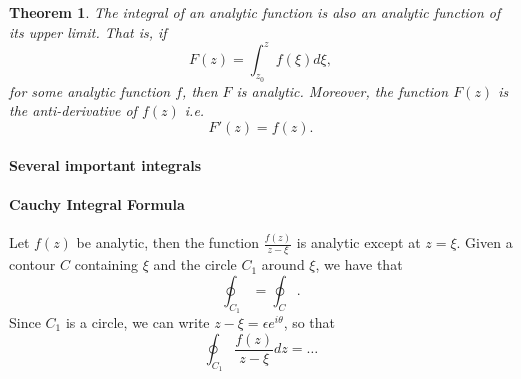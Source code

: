 \documentclass[12pt]{article}
\newcommand{\bbN}{\mathbb{N}}
\newtheorem{thm}{Theorem}[section]
\theoremstyle{definition}
\theoremstyle{remark}
\numberwithin{equation}{section}
\begin{document}


\begin{thm}
The integral of an analytic function is also an analytic function of its upper limit. That is, if 
\begin{equation}
  F(z) = \int_{z_0}^z f(\xi)d\xi,
\end{equation}
for some analytic function $f$, then $F$ is analytic. Moreover, the function $F(z)$ is the anti-derivative of $f(z)$ i.e.
\begin{equation}
  F'(z) = f(z).
\end{equation}
\end{thm}




\paragraph{Several important integrals}%
\label{par:several_important_integrals}




\paragraph{Cauchy Integral Formula}%
\label{par:cauchy_integral_formula}


Let $f(z)$ be analytic, then the function $\frac{f(z)}{z-\xi}$ is analytic except at $z=\xi$. Given a contour $C$ containing $\xi$ and the circle $C_1$ around $\xi$, we have that
\begin{equation}
  \oint_{C_1} = \oint_{C}.
\end{equation}
Since $C_1$ is a circle, we can write $z - \xi = \epsilon e^{i\theta}$, so that
\begin{equation}
  \oint_{C_1} \frac{f(z)}{z-\xi}dz = \ldots
\end{equation}
\end{document}
